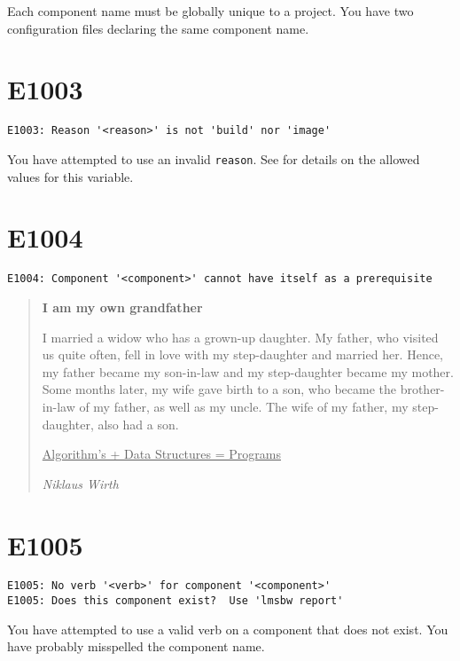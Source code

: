 Each component name must be globally unique to a project.  You have
two configuration files declaring the same component name.

\section{E1003}

\begin{verbatim}
E1003: Reason '<reason>' is not 'build' nor 'image'
\end{verbatim}

You have attempted to use an invalid \texttt{reason}.  See
 for details on the allowed values for this
variable.

\section{E1004}

\begin{verbatim}
E1004: Component '<component>' cannot have itself as a prerequisite
\end{verbatim}

\begin{quote}
  \textbf{I am my own grandfather}

  I married a widow who has a grown-up daughter.  My father, who
  visited us quite often, fell in love with my step-daughter and
  married her.  Hence, my father became my son-in-law and my
  step-daughter became my mother.  Some months later, my wife gave
  birth to a son, who became the brother-in-law of my father, as well
  as my uncle. The wife of my father, my step-daughter, also had a
  son.

  \underline{Algorithm's + Data Structures = Programs}

  \emph{Niklaus Wirth}
\end{quote}

\section{E1005}

\begin{verbatim}
E1005: No verb '<verb>' for component '<component>'
E1005: Does this component exist?  Use 'lmsbw report'
\end{verbatim}

You have attempted to use a valid \lmsbw verb on a component that does
not exist.  You have probably misspelled the component name.


